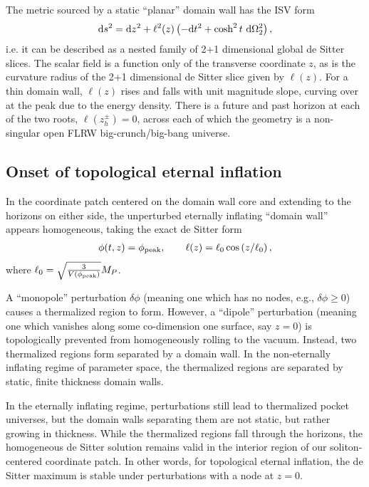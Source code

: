 \documentclass[aps,amsfonts,amsmath,prd,preprint,nofootinbib]{revtex4}
\newcommand{\Mp}{{M_{P}}}
\newcommand{\rmd}{{\rm d}}
\begin{document}
\begin{appendix}
The metric sourced by a static ``planar'' domain wall has the ISV \cite{Ipser:1983db, Vilenkin:1984hy} form
\begin{align}
\rmd s^2 = \rmd z^2 + \ell^2(z)\left( -\rmd t^2 + \cosh^2 t~\rmd \Omega_2^2\right),\label{eq:ISVmetric}
\end{align}
i.e. it can be described as a nested family of 2+1 dimensional global de Sitter slices.  The scalar field is a function only of the transverse coordinate $z$, as is the curvature radius of the 2+1 dimensional de Sitter slice
given by $\ell(z)$.  For a thin domain wall, $\ell(z)$ rises and falls with unit magnitude slope, curving over at the peak due to the energy density.  There is a future and past horizon at each of the two roots, $\ell(z_h^\pm) = 0$, across each of which the geometry is a non-singular open FLRW big-crunch/big-bang universe.



\subsection{Onset of topological eternal inflation}
In the coordinate patch centered on the domain wall core and extending to the horizons on either side,
the unperturbed eternally inflating ``domain wall'' appears homogeneous, taking the exact de Sitter form
\begin{align}
\phi(t,z) = \phi_{\rm peak}, \qquad \ell(z) = \ell_0\cos\left(z/\ell_0 \right),
\end{align}
where $\ell_0 = \sqrt{\frac{3}{V(\phi_{\rm peak})}}\Mp$.   

A ``monopole'' perturbation $\delta\phi$ (meaning one which has no nodes, e.g., $\delta\phi \geq 0$) causes a thermalized region to form.  However, a ``dipole'' perturbation
(meaning one which vanishes along some co-dimension one surface, say $z=0$) is topologically prevented from homogeneously rolling to the vacuum.  Instead, two thermalized regions form separated by a domain wall.
In the non-eternally inflating regime of parameter space, the thermalized regions are separated by static, finite thickness domain walls.  

In the eternally inflating regime, perturbations still lead to thermalized pocket universes, but the domain walls separating them are not static, but rather growing in thickness.
While the thermalized regions fall through the horizons, the homogeneous de Sitter solution remains valid in the interior region of our soliton-centered coordinate patch.
In other words, for topological eternal inflation, the de Sitter maximum is stable under perturbations with a node at $z = 0$.  


\end{appendix}
\end{document}
